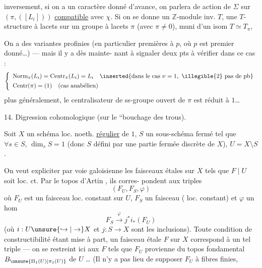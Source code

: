 

inversement, si on a un caractère  donné d'avance,
on parlera de  action de $\Sigma$ sur $(\pi,([L_i]))$
\uline{compatible} avec $\chi$. Si on se donne un
$\mathbb Z$-module inv. $T$, une $T$-structure à lacets
sur un groupe à lacets $\pi$ (avec $\pi\ne0$), muni
d'un isom $T\simeq T_\pi$, 

On a des variantes profinies
(en particulier premières à $p$, où $p$ est premier
donné\dots) --- mais il y a dès mainte-
nant à signaler deux pts à vérifier dans
ce cas :
\[
\left\{
\begin{array}{l}
\operatorname{Norm}_{\pi}(L_i)=\operatorname{Centr}_{\pi}(L_i)=L_i
\quad\inserted{\text{dans le cas }\nu=1,\ \illegible{2}\text{ pas de pb}}\\[4pt]
\operatorname{Centr}(\pi)=(1)\quad(\text{cas anabélien})
\end{array}
\right.
\]
plus généralement, le centralisateur
de  ss-groupe ouvert de $\pi$
est réduit à $1$\dots
{}



14. Digression cohomologique (sur le ``bouchage des
trous).

Soit $X$ un schéma loc. noeth. \uline{régulier} de
 $1$, $S$ un sous-schéma fermé  tel que
$\forall s\in S$, $\dim_s S=1$ (donc $S$ défini par une
partie fermée discrète de $X$), $U=X\setminus S$.

On veut expliciter par voie galoisienne les
faisceaux  étales  sur $X$ tels que $F\mid U$ soit
loc. ct. Par le topos d'Artin , ils corres-
pondent aux triples
\[
(F_U,F_S,\varphi)
\]
où $F_U$ est un faisceau  loc. constant sur $U$,
$F_S$ un faisceau ( loc. constant)
et $\varphi$ un hom
\[
F_S\xrightarrow{\varphi}j^{*}i_{*}(F_U)
\]
(où $i:U\unsure{\hookrightarrow|\to}X$ et $j:S\to X$ sont les inclusions).
Toute condition de constructibilité étant mise à
part, un faisceau étale $F$ sur $X$ correspond
à un tel triple --- on se restreint ici aux
$F$ tels que $F_U$  provienne du
topos fondamental $B_{\unsure{\Pi_1(U)|\pi_1(U)}}$ de $U$ \dots
(Il n'y a pas lieu de supposer $F_U$ à fibres finies,

